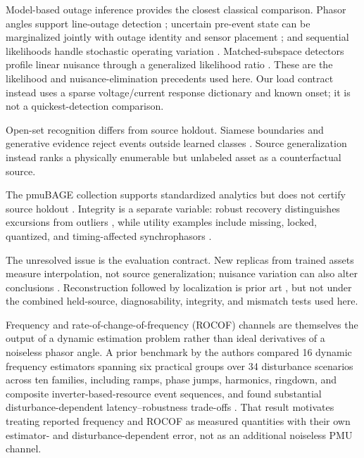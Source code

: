 Model-based outage inference provides the closest classical comparison. Phasor angles support line-outage detection \cite{tate2008outage}; uncertain pre-event state can be marginalized jointly with outage identity and sensor placement \cite{zhao2014outages}; and sequential likelihoods handle stochastic operating variation \cite{chen2016quickest,rovatsos2017outage}. Matched-subspace detectors profile linear nuisance through a generalized likelihood ratio \cite{scharf1994matched}. These are the likelihood and nuisance-elimination precedents used here. Our load contract instead uses a sparse voltage/current response dictionary and known onset; it is not a quickest-detection comparison.

Open-set recognition differs from source holdout. Siamese boundaries and generative evidence reject events outside learned classes \cite{kummerow2022siamese,kummerow2023sigmoid,hu2026openset}. Source generalization instead ranks a physically enumerable but unlabeled asset as a counterfactual source.

The pmuBAGE collection supports standardized analytics but does not certify source holdout \cite{foggo2024pmubage}. Integrity is a separate variable: robust recovery distinguishes excursions from outliers \cite{chatterjee2020robust}, while utility examples include missing, locked, quantized, and timing-affected synchrophasors \cite{biswas2025quality}.

The unresolved issue is the evaluation contract. New replicas from trained assets measure interpolation, not source generalization; nuisance variation can also alter conclusions \cite{kummerow2023nuisance}. Reconstruction followed by localization is prior art \cite{zhai2025partial,rimkus2025gnn}, but not under the combined held-source, diagnosability, integrity, and mismatch tests used here.

Frequency and rate-of-change-of-frequency (ROCOF) channels are themselves the output of a dynamic estimation problem rather than ideal derivatives of a noiseless phasor angle. A prior benchmark by the authors compared 16 dynamic frequency estimators spanning six practical groups over 34 disturbance scenarios across ten families, including ramps, phase jumps, harmonics, ringdown, and composite inverter-based-resource event sequences, and found substantial disturbance-dependent latency--robustness trade-offs \cite{Mayorga2026FrequencyBenchmark}. That result motivates treating reported frequency and ROCOF as measured quantities with their own estimator- and disturbance-dependent error, not as an additional noiseless PMU channel.

